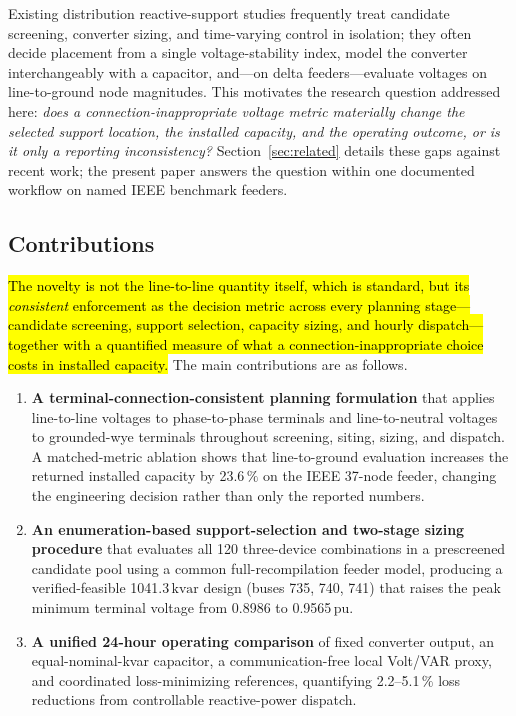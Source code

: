 \documentclass{ieeeaccess}
\newcommand{\rev}[1]{{\color{red}\hl{#1}}}
\newcommand{\rev}[1]{#1}
\newcommand{\num}[1]{#1}
\newcommand{\SI}[2]{#1\,\ensuremath{\mathrm{#2}}}
\newcommand{\SIrange}[3]{#1\mbox{--}#2\,\ensuremath{\mathrm{#3}}}
\newcommand{\kvar}{\text{kvar}}
\begin{document}
Existing distribution reactive-support studies frequently treat candidate
screening, converter sizing, and time-varying control in isolation; they often
decide placement from a single voltage-stability index, model the converter
interchangeably with a capacitor, and---on delta feeders---evaluate voltages on
line-to-ground node magnitudes. This motivates the research question addressed
here: \emph{does a connection-inappropriate voltage metric materially change the
selected support location, the installed capacity, and the operating outcome, or is
it only a reporting inconsistency?} Section~\ref{sec:related} details these gaps
against recent work; the present paper answers the question within one documented
workflow on named IEEE benchmark feeders.

\subsection{Contributions}
\rev{The novelty is not the line-to-line
quantity itself, which is standard, but its \emph{consistent} enforcement as the
decision metric across every planning stage---candidate screening, support
selection, capacity sizing, and hourly dispatch---together with a quantified
measure of what a connection-inappropriate choice costs in installed capacity.}
The main contributions are as follows.
\begin{enumerate}
\item \textbf{A terminal-connection-consistent planning formulation} that applies
line-to-line voltages to phase-to-phase terminals and line-to-neutral voltages to
grounded-wye terminals throughout screening, siting, sizing, and dispatch. A
matched-metric ablation shows that line-to-ground evaluation increases the returned
installed capacity by \SI{23.6}{\%} on the IEEE 37-node feeder, changing the
engineering decision rather than only the reported numbers.
\item \textbf{An enumeration-based support-selection and two-stage sizing procedure}
that evaluates all \num{120} three-device combinations in a prescreened candidate
pool using a common full-recompilation feeder model, producing a verified-feasible
\SI{1041.3}{\kvar} design (buses 735, 740, 741) that raises the peak minimum
terminal voltage from \num{0.8986} to \SI{0.9565}{pu}.
\item \textbf{A unified 24-hour operating comparison} of fixed converter output, an
equal-nominal-kvar capacitor, a communication-free local Volt/VAR proxy, and
coordinated loss-minimizing references, quantifying \SIrange{2.2}{5.1}{\%} loss
reductions from controllable reactive-power dispatch.
\end{enumerate}
\end{document}
